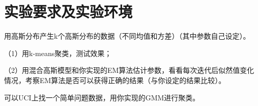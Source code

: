 \section{实验要求及实验环境}

用高斯分布产生k个高斯分布的数据（不同均值和方差）（其中参数自己设定）。

（1）用k-means聚类，测试效果；

（2）用混合高斯模型和你实现的EM算法估计参数，看看每次迭代后似然值变化情况，考察EM算法是否可以获得正确的结果（与你设定的结果比较）。

可以UCI上找一个简单问题数据，用你实现的GMM进行聚类。
